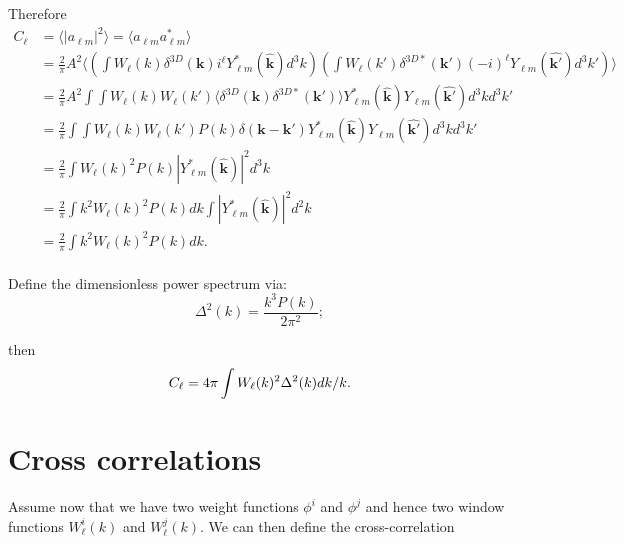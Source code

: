 \documentclass[11pt]{article}
\begin{document}
Therefore
\begin{equation}
\begin{split}
C_{\ell} &= \langle | a_{\ell m} | ^2 \rangle = \langle a_{\ell m} a^{\ast}_{\ell m} \rangle \\
&= \frac{2}{\pi} A^2 \langle \left( \int W_{\ell}(k) \delta^{3D}(\boldsymbol{k}) i^{\ell}   Y_{\ell m}^{\ast}(\boldsymbol{\hat{k}}) d^3k \right) \left( \int W_{\ell}(k') \delta^{3D\ast}(\boldsymbol{k'}) (-i)^{\ell}   Y_{\ell m}(\boldsymbol{\hat{k'}}) d^3k' \right) \rangle \\
&= \frac{2}{\pi} A^2 \int \int W_{\ell}(k) W_{\ell}(k') \langle \delta^{3D}(\boldsymbol{k}) \delta^{3D\ast}(\boldsymbol{k'}) \rangle Y_{\ell m}^{\ast}(\boldsymbol{\hat{k}}) Y_{\ell m}(\boldsymbol{\hat{k'}}) d^3k d^3k' \\
&= \frac{2}{\pi} \int \int W_{\ell}(k) W_{\ell}(k') P(k) \delta(\boldsymbol{k}-\boldsymbol{k'}) Y_{\ell m}^{\ast}(\boldsymbol{\hat{k}}) Y_{\ell m}(\boldsymbol{\hat{k'}}) d^3k d^3k' \\
&= \frac{2}{\pi} \int W_{\ell}(k)^2 P(k) | Y_{\ell m}^{\ast}(\boldsymbol{\hat{k}}) | ^2 d^3k \\
&= \frac{2}{\pi} \int k^2 W_{\ell}(k)^2 P(k) dk \int | Y_{\ell m}^{\ast}(\boldsymbol{\hat{k}}) | ^2 d^2k \\
&= \frac{2}{\pi} \int k^2 W_{\ell}(k)^2 P(k) dk. \\
\end{split}
\end{equation}

Define the dimensionless power spectrum via:
\begin{equation}
\Delta^2(k) = \frac{k^3 P(k)}{2 \pi^2};
\end{equation}

then
\begin{equation}
C_{\ell} = 4 \pi \int W_{\ell}(k)^2 \Delta^2(k) dk/k. \\
\end{equation}

\section{Cross correlations}

Assume now that we have two weight functions $\phi^i$ and $\phi^j$ and hence two window functions $W_{\ell}^i(k)$ and $W_{\ell}^j(k)$. We can then define the cross-correlation
\end{document}
